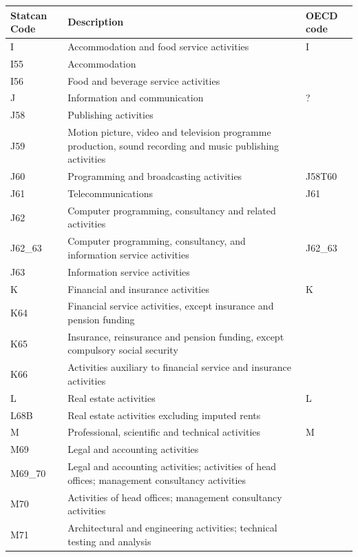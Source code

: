 \documentclass{article}
\begin{document}
\small
{}
\begin{tabularx}{\textwidth}{l X l}
\hline
\textbf{Statcan Code} & \textbf{Description} & \textbf{OECD code} \\
\hline
\hline
I       & Accommodation and food service activities & I \\
I55     & Accommodation &  \\
I56     & Food and beverage service activities &  \\
J       & Information and communication & ? \\
J58     & Publishing activities &  \\
J59     & Motion picture, video and television programme production, sound recording and music publishing activities &  \\
J60     & Programming and broadcasting activities & J58T60 \\
J61     & Telecommunications & J61 \\
J62     & Computer programming, consultancy and related activities &  \\
J62\_63 & Computer programming, consultancy, and information service activities & J62\_63 \\
J63     & Information service activities &  \\
K       & Financial and insurance activities & K \\
K64     & Financial service activities, except insurance and pension funding &  \\
K65     & Insurance, reinsurance and pension funding, except compulsory social security &  \\
K66     & Activities auxiliary to financial service and insurance activities &  \\
L       & Real estate activities & L \\
L68B    & Real estate activities excluding imputed rents & \\
M       & Professional, scientific and technical activities & M \\
M69     & Legal and accounting activities &  \\
M69\_70 & Legal and accounting activities; activities of head offices; management consultancy activities &  \\
M70     & Activities of head offices; management consultancy activities &  \\
M71     & Architectural and engineering activities; technical testing and analysis &  \\

\end{tabularx}
\end{document}
